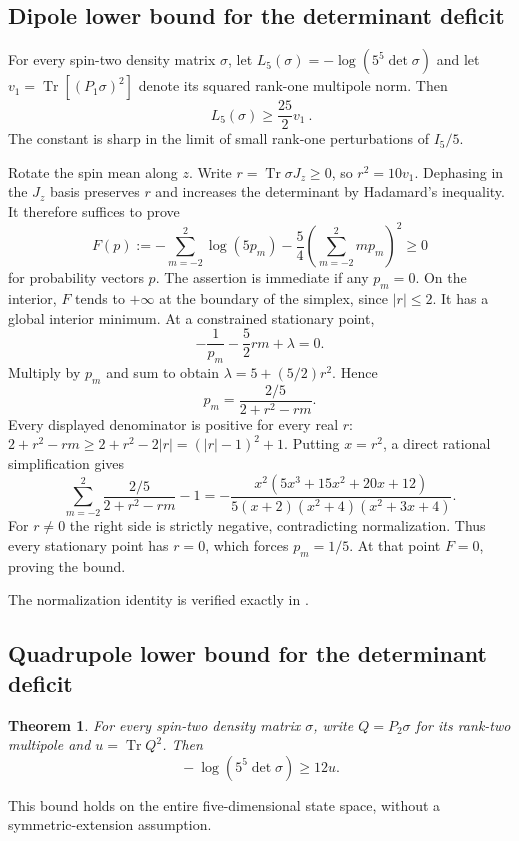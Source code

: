 \documentclass[11pt,a4paper]{article}
\newcommand{\Tr}{\operatorname{Tr}}
\newtheorem{theorem}{Theorem}
\begin{document}
\subsection{Dipole lower bound for the determinant deficit}
For every spin-two density matrix $\sigma$, let
$L_5(\sigma)=-\log(5^5\det\sigma)$ and let
$v_1=\Tr[(P_1\sigma)^2]$ denote its squared rank-one multipole norm.
Then
\[
\boxed{\ L_5(\sigma)\ge\frac{25}{2}v_1\ }.
\]
The constant is sharp in the limit of small rank-one perturbations of
$I_5/5$.

Rotate the spin mean along $z$. Write $r=\Tr\sigma J_z\ge0$, so
$r^2=10v_1$. Dephasing in the $J_z$ basis preserves $r$ and increases
the determinant by Hadamard's inequality. It therefore suffices to prove
\[
F(p):=-\sum_{m=-2}^2\log(5p_m)-\frac54\left(\sum_{m=-2}^2mp_m\right)^2
\ge0
\]
for probability vectors $p$. The assertion is immediate if any $p_m=0$.
On the interior, $F$ tends to $+\infty$ at the boundary of the simplex,
since $|r|\le2$. It has a global interior minimum.
At a constrained stationary point,
\[
-\frac1{p_m}-\frac52rm+\lambda=0.
\]
Multiply by $p_m$ and sum to obtain $\lambda=5+(5/2)r^2$. Hence
\[
p_m=\frac{2/5}{2+r^2-rm}.
\]
Every displayed denominator is positive for every real $r$:
$2+r^2-rm\ge2+r^2-2|r|=(|r|-1)^2+1$.
Putting $x=r^2$, a direct rational simplification gives
\[
\sum_{m=-2}^2\frac{2/5}{2+r^2-rm}-1
=-\frac{x^2(5x^3+15x^2+20x+12)}
 {5(x+2)(x^2+4)(x^2+3x+4)}.
\]
For $r\ne0$ the right side is strictly negative, contradicting
normalization. Thus every stationary point has $r=0$, which forces
$p_m=1/5$. At that point $F=0$, proving the bound.

The normalization identity is verified exactly in
.



\subsection{Quadrupole lower bound for the determinant deficit}
\begin{theorem}
For every spin-two density matrix $\sigma$, write
$Q=P_2\sigma$ for its rank-two multipole and $u=\Tr Q^2$.
Then
\[
\boxed{\ -\log(5^5\det\sigma)\ge12u.\ }
\]
\end{theorem}
This bound holds on the entire five-dimensional state space, without a
symmetric-extension assumption.
\end{document}
